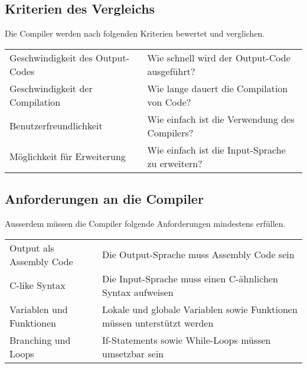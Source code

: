 \subsection{Kriterien des Vergleichs}
Die Compiler werden nach folgenden Kriterien bewertet und verglichen.

\begin{table}[h!]
    \begin{tabular}{l|l}
    Geschwindigkeit des Output-Codes    & Wie schnell wird der Output-Code ausgeführt?                      \\
    Geschwindigkeit der Compilation     & Wie lange dauert die Compilation von Code?                        \\
    Benutzerfreundlichkeit              & Wie einfach ist die Verwendung des Compilers?                     \\
    Möglichkeit für Erweiterung         & Wie einfach ist die Input-Sprache zu erweitern?                                 
    \end{tabular}
\end{table}

\subsection{Anforderungen an die Compiler}
Ausserdem müssen die Compiler folgende Anforderungen mindestens erfüllen.

\begin{table}[h]
    \begin{tabular}{l|l}
    Output als Assembly Code        & Die Output-Sprache muss Assembly Code sein                               \\
    C-like Syntax                   & Die Input-Sprache muss einen C-ähnlichen Syntax aufweisen                \\
    Variablen und Funktionen        & Lokale und globale Variablen sowie Funktionen müssen unterstützt werden  \\
    Branching und Loops             & If-Statements sowie While-Loops müssen umsetzbar sein                            
    \end{tabular}
\end{table}

